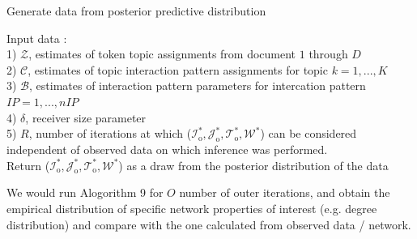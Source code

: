 \documentclass[a4paper]{article}
\begin{document}
     \begin{algorithm}[H]
        	\SetAlgoLined
        	\caption{Generate data from posterior predictive distribution}
        	Input data :\\
        	1) $\mathcal{Z}$, estimates of token topic assignments from document $1$ through $D$\\
        	2) $\mathcal{C}$, estimates of topic interaction pattern assignments for topic $k = 1,...,K$\\
        	3) $\mathcal{B}$,  estimates of interaction pattern parameters for intercation pattern $IP = 1,...,nIP$\\
        	4) $\delta$, receiver size parameter \\
	5) $R$, number of iterations at which ($\mathcal{I}_{\mbox{o}}^*, \mathcal{J}_{\mbox{o}}^*, \mathcal{T}_{\mbox{o}}^*,\mathcal{W}^*$) can be considered independent of observed data on which inference was performed.\\
      Return ($\mathcal{I}_{\mbox{o}}^*, \mathcal{J}_{\mbox{o}}^*, \mathcal{T}_{\mbox{o}}^*,\mathcal{W}^*$) as a draw from the posterior distribution of the data
        \end{algorithm}
We would run Alogorithm 9 for $O$ number of outer iterations, and obtain the empirical distribution of specific network properties of interest (e.g. degree distribution) and compare with the one calculated from observed data / network.
\end{document}
